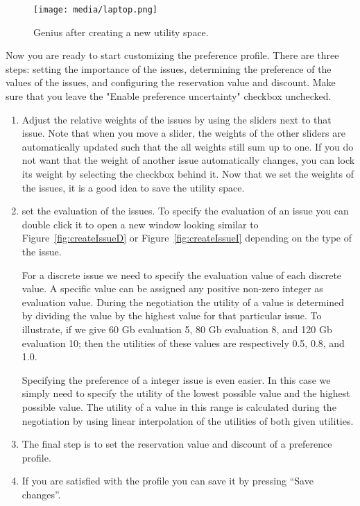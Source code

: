 \documentclass[]{article}
\newcommand\Genius{{\sc Genius}}
\begin{document}
\begin{figure}[htb]
	\centering
	\texttt{[image: media/laptop.png]}
\caption{{\Genius} after creating a new utility space.}\label{fig:utilcreated}
\end{figure}

Now you are ready to start customizing the preference profile. There are three steps: setting the importance of the issues, determining the preference of the values of the issues, and configuring the reservation value and discount. Make sure that you leave the "Enable preference uncertainty" checkbox unchecked.

\begin{enumerate}
\item Adjust the relative weights of the issues by using the sliders next to that issue. Note that when you move a slider, the weights of the other sliders are automatically updated such that the all weights still sum up to one. If you do not want that the weight of another issue automatically changes, you can lock its weight by selecting the checkbox behind it. Now that we set the weights of the issues, it is a good idea to save the utility space.
\item set the evaluation of the issues. To specify the evaluation of an issue you can double click it to open a new window looking similar to Figure~\ref{fig:createIssueD} or Figure~\ref{fig:createIssueI} depending on the type of the issue.

For a discrete issue we need to specify the evaluation value of each discrete value. A specific value can be assigned any positive non-zero integer as evaluation value. During the negotiation the utility of a value is determined by dividing the value by the highest value for that particular issue. To illustrate, if we give 60 Gb evaluation 5, 80 Gb evaluation 8, and 120 Gb evaluation 10; then the utilities of these values are respectively 0.5, 0.8, and 1.0.

Specifying the preference of a integer issue is even easier. In this case we simply need to specify the utility of the lowest possible value and the highest possible value. The utility of a value in this range is calculated during the negotiation by using linear interpolation of the utilities of both given utilities.

\item The final step is to set the reservation value and discount of a preference profile. 

\item If you are satisfied with the profile you can save it by pressing ``Save changes''. 
\end{enumerate}
\end{document}
